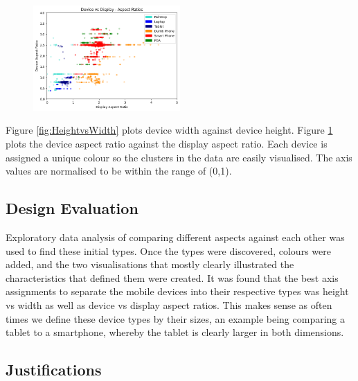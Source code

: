 \documentclass[conference]{IEEEtran}
\begin{document}
\begin{figure}
    \centering
    \includegraphics[width=0.5\textwidth]{../Visualisations/A/DevicevsDisplayColour.png}
    \caption{}
    \label{fig:DevicevsDisplay}
\end{figure}

Figure \ref{fig:HeightvsWidth} plots device width against device height. Figure \ref{fig:DevicevsDisplay} plots the device aspect ratio against the display aspect ratio. Each device is assigned a unique colour so the clusters in the data are easily visualised. The axis values are normalised to be within the range of (0,1).

\subsection{Design Evaluation}

Exploratory data analysis of comparing different aspects against each other was used to find these initial types.
Once the types were discovered, colours were added, and the two visualisations that mostly clearly illustrated the characteristics that defined them were created. It was found that the best axis assignments to separate the mobile devices into their respective types was height vs width as well as device vs display aspect ratios. This makes sense as often times we define these device types by their sizes, an example being comparing a tablet to a smartphone, whereby the tablet is clearly larger in both dimensions. 

\subsection{Justifications}
\end{document}
